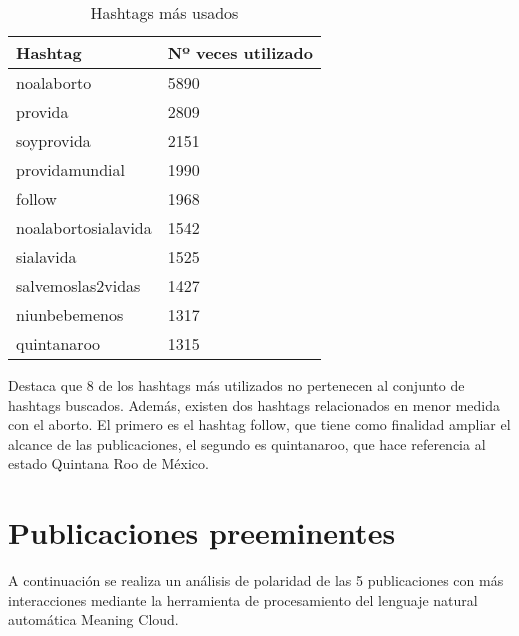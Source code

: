 \documentclass{article}
\begin{document}
\begin{table}[]
\centering
\begin{tabular}{|l|l|}
\hline
Hashtag             & Nº veces utilizado \\ \hline
noalaborto          & 5890               \\ \hline
provida             & 2809               \\ \hline
soyprovida          & 2151               \\ \hline
providamundial      & 1990               \\ \hline
follow              & 1968               \\ \hline
noalabortosialavida & 1542               \\ \hline
sialavida           & 1525               \\ \hline
salvemoslas2vidas   & 1427               \\ \hline
niunbebemenos       & 1317               \\ \hline
quintanaroo         & 1315               \\ \hline
\end{tabular}
\caption{Hashtags más usados}
\label{tab:hashtags}
\end{table}
Destaca que 8 de los hashtags más utilizados no pertenecen al conjunto de hashtags buscados. Además, existen dos hashtags relacionados en menor medida con el aborto. El primero es el hashtag follow, que tiene como finalidad ampliar el alcance de las publicaciones, el segundo es quintanaroo, que hace referencia al estado Quintana Roo de México.

\section{Publicaciones preeminentes}

A continuación se realiza un análisis de polaridad de las 5 publicaciones con más interacciones mediante la herramienta de procesamiento del lenguaje natural automática Meaning Cloud.
\end{document}
